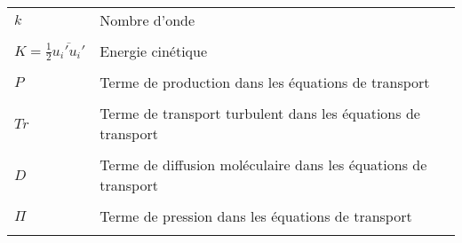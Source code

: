 
\begin{center}
\begin{tabular}{ m{3cm} m{11.5cm} m{1cm} } 
\\[-4em]
$k$ & Nombre d'onde &  \\
\\[-2.625em]
$K=\frac{1}{2}\overline{u_{i}'u_{i}'}$ & Energie cinétique &  \\
\\[-2.625em]
$P$ & Terme de production dans les équations de transport &  \\
\\[-2.625em]
$Tr$ & Terme de transport turbulent dans les équations de transport &  \\
\\[-2.625em]
$D$ & Terme de diffusion moléculaire dans les équations de transport &  \\
\\[-2.625em]
$\Pi$ & Terme de pression dans les équations de transport &  \\
\\[-2.625em]
\end{tabular}
\end{center}


